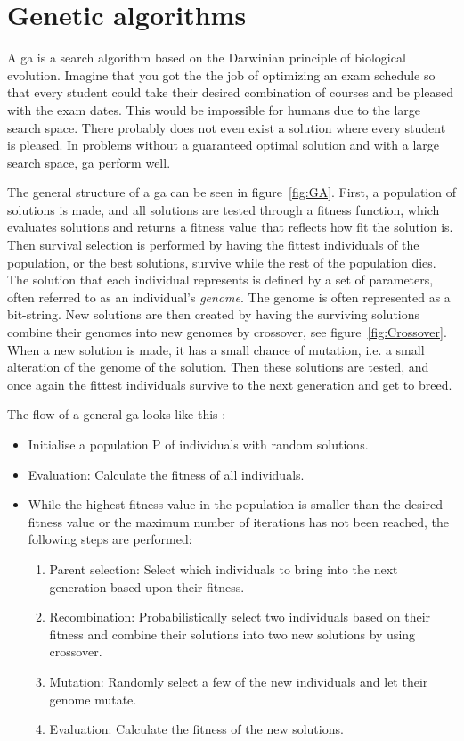 \section{Genetic algorithms} \label{GAalgorithm}
A \ac{ga} is a search algorithm based on the Darwinian principle of biological evolution. Imagine that you got the the job of optimizing an exam schedule so that every student could take their desired combination of courses and be pleased with the exam dates. This would be impossible for humans due to the large search space. There probably does not even exist a solution where every student is pleased. In problems without a guaranteed optimal solution and with a large search space, \ac{ga} perform well.

The general structure of a \ac{ga} can be seen in figure~\ref{fig:GA}. First, a population of solutions is made, and all solutions are tested through a fitness function, which evaluates solutions and returns a fitness value that reflects how fit the solution is. Then survival selection is performed by having the fittest individuals of the population, or the best solutions, survive while the rest of the population dies. The solution that each individual represents is defined by a set of parameters, often referred to as an individual’s \textit{genome}. The genome is often represented as a bit-string. New solutions are then created by having the surviving solutions combine their genomes into new genomes by crossover, see figure~\ref{fig:Crossover}. When a new solution is made, it has a small chance of mutation, i.e. a small alteration of the genome of the solution. Then these solutions are tested, and once again the fittest individuals survive to the next generation and get to breed.

The flow of a general \ac{ga} looks like this \citep{michalski2013machine}:
\begin{itemize}
    \item Initialise a population P of individuals with random solutions.
    \item Evaluation: Calculate the fitness of all individuals.
    \item While the highest fitness value in the population is smaller than the desired fitness value or the maximum number of iterations has not been reached, the following steps are performed:
    \begin{enumerate}
        \item Parent selection: Select which individuals to bring into the next generation based upon their fitness.
        \item Recombination: Probabilistically select two individuals based on their fitness and combine their solutions into two new solutions by using crossover.
        \item Mutation: Randomly select a few of the new individuals and let their genome mutate.
        \item Evaluation: Calculate the fitness of the new solutions.
    \end{enumerate}
\end{itemize}



